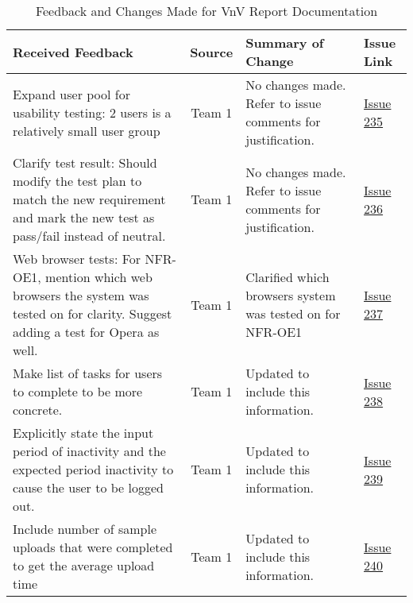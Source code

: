 \documentclass{article}
\begin{document}
\begin{table}[H]
\centering
\begin{tabularx}{\textwidth}{|X|c|X|p{1.5cm}|}
    \hline
    \textbf{Received Feedback} & \textbf{Source} & \textbf{Summary of Change}
    & \textbf{Issue Link} \\
    \hline
    Expand user pool for usability testing: 2 users is a relatively small user
    group & Team 1 & No changes made. Refer to issue comments for justification.
    & \href{https://github.com/SumanyaG/Alkalytics/issues/235}{Issue 235} \\
    \hline
    Clarify test result: Should modify the test plan to match the new
    requirement and mark the new test as pass/fail instead of neutral. & Team 1
    & No changes made. Refer to issue comments for justification. &
    \href{https://github.com/SumanyaG/Alkalytics/issues/236}{Issue 236} \\
    \hline
    Web browser tests: For NFR-OE1, mention which web browsers the system was
    tested on for clarity. Suggest adding a test for Opera as well. & Team 1 &
    Clarified which browsers system was tested on for NFR-OE1 &
    \href{https://github.com/SumanyaG/Alkalytics/issues/237}{Issue 237} \\
    \hline
    Make list of tasks for users to complete to be more concrete. & Team 1 &
    Updated to include this information. &
    \href{https://github.com/SumanyaG/Alkalytics/issues/238}{Issue 238} \\ 
    \hline
    Explicitly state the input period of inactivity and the expected period
    inactivity to cause the user to be logged out. & Team 1 & Updated to include
    this information. &
    \href{https://github.com/SumanyaG/Alkalytics/issues/239}{Issue 239} \\
    \hline
    Include number of sample uploads that were completed to get the average
    upload time & Team 1 & Updated to include this information. &
    \href{https://github.com/SumanyaG/Alkalytics/issues/240}{Issue 240} \\
    \hline
\end{tabularx}
\caption{Feedback and Changes Made for VnV Report Documentation}
\label{table:VnV2}
\end{table}
\end{document}
